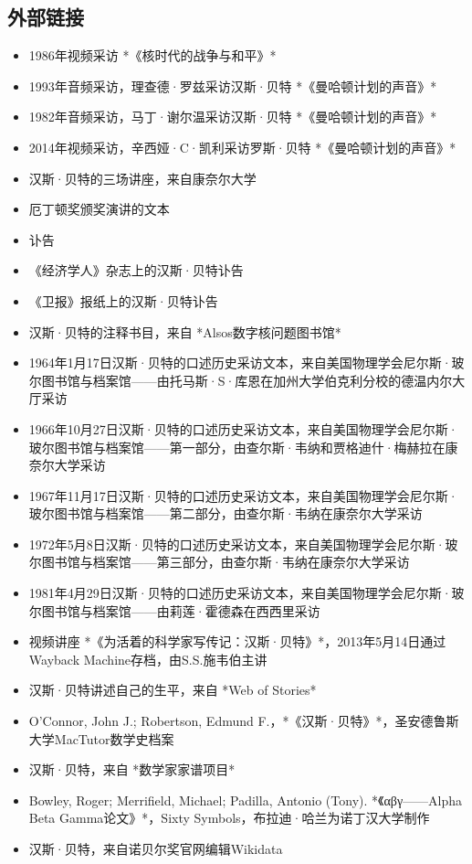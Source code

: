 \subsection{外部链接}
\begin{itemize}
\item 1986年视频采访 *《核时代的战争与和平》*  
\item 1993年音频采访，理查德·罗兹采访汉斯·贝特 *《曼哈顿计划的声音》*  
\item 1982年音频采访，马丁·谢尔温采访汉斯·贝特 *《曼哈顿计划的声音》*  
\item 2014年视频采访，辛西娅·C·凯利采访罗斯·贝特 *《曼哈顿计划的声音》*  
\item 汉斯·贝特的三场讲座，来自康奈尔大学  
\item 厄丁顿奖颁奖演讲的文本  
\item 讣告  
\item 《经济学人》杂志上的汉斯·贝特讣告  
\item 《卫报》报纸上的汉斯·贝特讣告
\item 汉斯·贝特的注释书目，来自 *Alsos数字核问题图书馆*  
\item 1964年1月17日汉斯·贝特的口述历史采访文本，来自美国物理学会尼尔斯·玻尔图书馆与档案馆——由托马斯·S·库恩在加州大学伯克利分校的德温内尔大厅采访  
\item 1966年10月27日汉斯·贝特的口述历史采访文本，来自美国物理学会尼尔斯·玻尔图书馆与档案馆——第一部分，由查尔斯·韦纳和贾格迪什·梅赫拉在康奈尔大学采访  
\item 1967年11月17日汉斯·贝特的口述历史采访文本，来自美国物理学会尼尔斯·玻尔图书馆与档案馆——第二部分，由查尔斯·韦纳在康奈尔大学采访  
\item 1972年5月8日汉斯·贝特的口述历史采访文本，来自美国物理学会尼尔斯·玻尔图书馆与档案馆——第三部分，由查尔斯·韦纳在康奈尔大学采访  
\item 1981年4月29日汉斯·贝特的口述历史采访文本，来自美国物理学会尼尔斯·玻尔图书馆与档案馆——由莉莲·霍德森在西西里采访  
\item 视频讲座 *《为活着的科学家写传记：汉斯·贝特》*，2013年5月14日通过Wayback Machine存档，由S.S.施韦伯主讲  
\item 汉斯·贝特讲述自己的生平，来自 *Web of Stories*  
\item O'Connor, John J.; Robertson, Edmund F.，*《汉斯·贝特》*，圣安德鲁斯大学MacTutor数学史档案  
\item 汉斯·贝特，来自 *数学家家谱项目*  
\item Bowley, Roger; Merrifield, Michael; Padilla, Antonio (Tony). *《αβγ——Alpha Beta Gamma论文》*，Sixty Symbols，布拉迪·哈兰为诺丁汉大学制作  
\item 汉斯·贝特，来自诺贝尔奖官网编辑Wikidata
\end{itemize}
